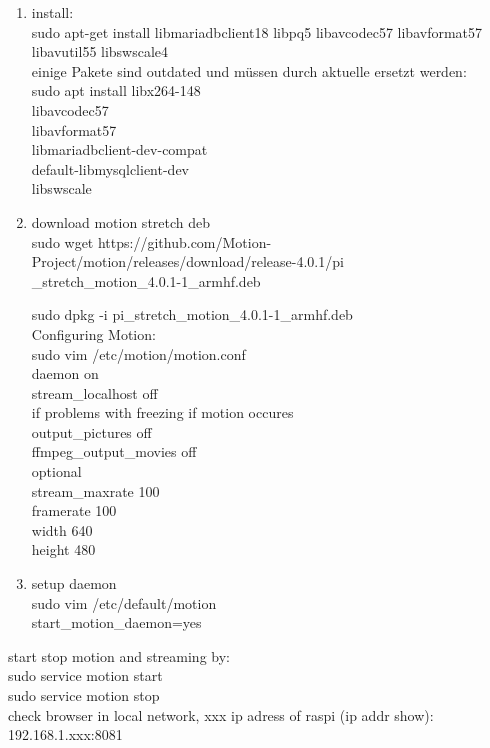 \begin{enumerate}
	\item install:\\
	sudo apt-get install libmariadbclient18 libpq5 libavcodec57  libavformat57 libavutil55 libswscale4\\
	einige Pakete sind outdated und müssen durch aktuelle ersetzt werden:\\
	sudo apt install libx264-148\\
	libavcodec57\\
	libavformat57\\
	libmariadbclient-dev-compat\\
	default-libmysqlclient-dev\\
	libswscale

	\item download motion stretch deb\\
	sudo wget https://github.com/Motion-Project/motion/releases/download/release-4.0.1/pi\\
	\_stretch\_motion\_4.0.1-1\_armhf.deb
	
	sudo dpkg -i pi\_stretch\_motion\_4.0.1-1\_armhf.deb\\

	Configuring Motion:\\
	sudo vim /etc/motion/motion.conf\\
	daemon on\\
	stream\_localhost off\\
	if problems with freezing if motion occures\\
	output\_pictures off\\
	ffmpeg\_output\_movies off\\
	optional\\
	stream\_maxrate 100\\
	framerate 100\\
	width 640\\
	height 480

	\item setup daemon\\
	sudo vim /etc/default/motion\\
	start\_motion\_daemon=yes
\end{enumerate}

start stop motion and streaming by:\\
sudo service motion start\\
sudo service motion stop\\

check browser in local network, xxx ip adress of raspi (ip addr show):\\
192.168.1.xxx:8081

